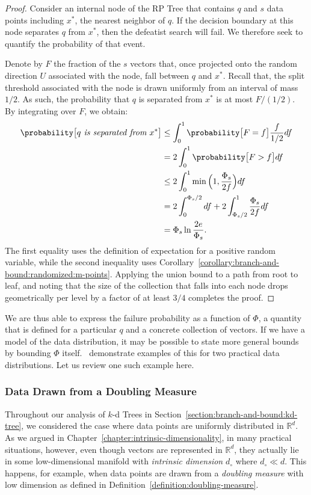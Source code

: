 \begin{proof}
    Consider an internal node of the RP Tree that contains $q$ and $s$ data points including $x^\ast$, the nearest neighbor of $q$.
    If the decision boundary at this node separates $q$ from $x^\ast$, then the defeatist search will fail.
    We therefore seek to quantify the probability of that event.

    Denote by $F$ the fraction of the $s$ vectors that, once projected onto the random direction $U$ associated with the node,
    fall between $q$ and $x^\ast$. Recall that, the split threshold associated with the node is drawn uniformly from an interval
    of mass $1/2$. As such, the probability that $q$ is separated from $x^\ast$ is at most
    $F/(1/2)$. By integrating over $F$, we obtain:
    \begin{align*}
        \probability\big[ \textit{$q$ is separated from $x^\ast$} \big] &\leq \int_0^1 \probability\big[ F = f\big] \frac{f}{1/2} df \\
        &= 2 \int_0^1 \probability\big[ F > f \big] df \\
        &\leq 2 \int_0^1 \min \Big( 1, \frac{\Phi_s}{2f} \Big) df \\
        &= 2 \int_0^{\Phi_s / 2} df + 2 \int_{\Phi_s / 2}^ 1 \frac{\Phi_s}{2f} df \\
        &= \Phi_s \ln \frac{2e}{\Phi_s}.
    \end{align*}
    The first equality uses the definition of expectation for a positive random variable,
    while the second inequality uses Corollary~\ref{corollary:branch-and-bound:randomized:m-points}.
    Applying the union bound to a path from root to leaf,
    and noting that the size of the collection that falls into each node
    drops geometrically per level by a factor of at least $3/4$ completes the proof.
\end{proof}

We are thus able to express the failure probability as a function of $\Phi$,
a quantity that is defined for a particular $q$ and a concrete collection of vectors.
If we have a model of the data distribution, it may be possible to
state more general bounds by bounding $\Phi$ itself.~\cite{dasgupta2015rptrees}
demonstrate examples of this for two practical data distributions.
Let us review one such example here.

\subsubsection{Data Drawn from a Doubling Measure}
\label{section:branch-and-bound:doubling-measure}
Throughout our analysis of $k$-d Trees in Section~\ref{section:branch-and-bound:kd-tree},
we considered the case where data points are uniformly distributed in $\mathbb{R}^d$.
As we argued in Chapter~\ref{chapter:intrinsic-dimensionality}, in many practical situations,
however, even though vectors are represented in $\mathbb{R}^d$,
they actually lie in some low-dimensional manifold with \emph{intrinsic dimension}
$d_\circ$ where $d_\circ \ll d$.
This happens, for example, when data points are drawn from a \emph{doubling measure}
with low dimension as defined in Definition~\ref{definition:doubling-measure}.

